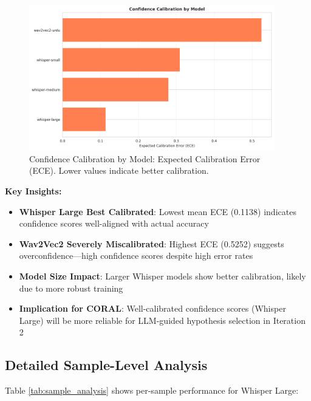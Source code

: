 \begin{figure}[H]
    \centering
    \includegraphics[width=0.95\textwidth]{ThesisFigs/calibration.png}
    \caption{Confidence Calibration by Model: Expected Calibration Error (ECE). Lower values indicate better calibration.}
    \label{fig:calibration}
\end{figure}

\textbf{Key Insights:}

\begin{itemize}
    \item \textbf{Whisper Large Best Calibrated}: Lowest mean ECE (0.1138) indicates confidence scores well-aligned with actual accuracy
    \item \textbf{Wav2Vec2 Severely Miscalibrated}: Highest ECE (0.5252) suggests overconfidence---high confidence scores despite high error rates
    \item \textbf{Model Size Impact}: Larger Whisper models show better calibration, likely due to more robust training
    \item \textbf{Implication for CORAL}: Well-calibrated confidence scores (Whisper Large) will be more reliable for LLM-guided hypothesis selection in Iteration 2
\end{itemize}

\subsection{Detailed Sample-Level Analysis}

Table \ref{tab:sample_analysis} shows per-sample performance for Whisper Large:

